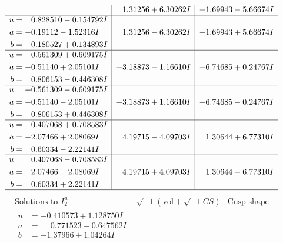 \documentclass[1p]{elsarticle_modified}
\theoremstyle{definition}
\newcommand{\I}{\sqrt{-1}}
\begin{document}
$$\begin{array}{c|c|c}
 & \phantom{-}1.31256 + 6.30262 I & -1.69943 - 5.66674 I \\ \hline\begin{aligned}
u &= \phantom{-}0.828510 - 0.154792 I \\
a &= -0.19112 - 1.52316 I \\
b &= -0.180527 + 0.134893 I\end{aligned}
 & \phantom{-}1.31256 - 6.30262 I & -1.69943 + 5.66674 I \\ \hline\begin{aligned}
u &= -0.561309 + 0.609175 I \\
a &= -0.51140 + 2.05101 I \\
b &= \phantom{-}0.806153 - 0.446308 I\end{aligned}
 & -3.18873 - 1.16610 I & -6.74685 + 0.24767 I \\ \hline\begin{aligned}
u &= -0.561309 - 0.609175 I \\
a &= -0.51140 - 2.05101 I \\
b &= \phantom{-}0.806153 + 0.446308 I\end{aligned}
 & -3.18873 + 1.16610 I & -6.74685 - 0.24767 I \\ \hline\begin{aligned}
u &= \phantom{-}0.407068 + 0.708583 I \\
a &= -2.07466 + 2.08069 I \\
b &= \phantom{-}0.60334 - 2.22141 I\end{aligned}
 & \phantom{-}4.19715 - 4.09703 I & \phantom{-}1.30644 + 6.77310 I \\ \hline\begin{aligned}
u &= \phantom{-}0.407068 - 0.708583 I \\
a &= -2.07466 - 2.08069 I \\
b &= \phantom{-}0.60334 + 2.22141 I\end{aligned}
 & \phantom{-}4.19715 + 4.09703 I & \phantom{-}1.30644 - 6.77310 I\\
 \hline 
 \end{array}$$\newpage$$\begin{array}{c|c|c}  
\text{Solutions to }I^u_{2}& \I (\text{vol} + \sqrt{-1}CS) & \text{Cusp shape}\\
 \hline 
\begin{aligned}
u &= -0.410573 + 1.128750 I \\
a &= \phantom{-}0.771523 - 0.647562 I \\
b &= -1.37966 + 1.04264 I\end{aligned}

\end{array}$$
\end{document}
